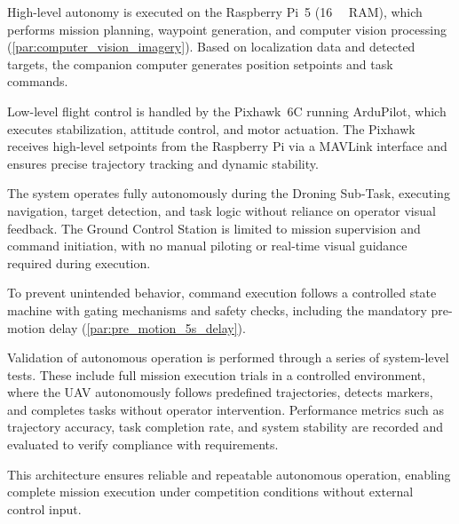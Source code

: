 
High-level autonomy is executed on the Raspberry Pi~5 (\qty{16}{\giga\byte} RAM), which performs mission planning, waypoint generation, and computer vision processing (\autoref{par:computer_vision_imagery}). Based on localization data and detected targets, the companion computer generates position setpoints and task commands.

Low-level flight control is handled by the Pixhawk~6C running ArduPilot, which executes stabilization, attitude control, and motor actuation. The Pixhawk receives high-level setpoints from the Raspberry Pi via a MAVLink interface and ensures precise trajectory tracking and dynamic stability.

The system operates fully autonomously during the Droning Sub-Task, executing navigation, target detection, and task logic without reliance on operator visual feedback. The Ground Control Station is limited to mission supervision and command initiation, with no manual piloting or real-time visual guidance required during execution.

To prevent unintended behavior, command execution follows a controlled state machine with gating mechanisms and safety checks, including the mandatory pre-motion delay (\autoref{par:pre_motion_5s_delay}).

Validation of autonomous operation is performed through a series of system-level tests. These include full mission execution trials in a controlled environment, where the UAV autonomously follows predefined trajectories, detects markers, and completes tasks without operator intervention. Performance metrics such as trajectory accuracy, task completion rate, and system stability are recorded and evaluated to verify compliance with requirements.

This architecture ensures reliable and repeatable autonomous operation, enabling complete mission execution under competition conditions without external control input.